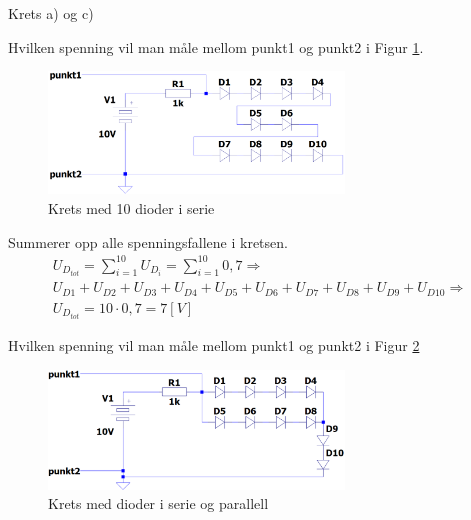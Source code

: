 \vspace{0.5cm} %

\begin{solution}[name=Løsningsforslag oppgave]
	Krets a) og c)
\end{solution}
\vspace{0.5cm} %

\begin{question}[name=Oppgave, topic=dioder]
Hvilken spenning vil man måle mellom punkt1 og punkt2 i Figur \ref{fig:10Dserie}.

	\begin{figure}[H]
		\centering
		\includegraphics[width=0.7\textwidth]{diode/figurer/10SerieD.png}
		\caption{Krets med 10 dioder i serie}
		\label{fig:10Dserie}
	\end{figure}

\end{question}

\vspace{0.5cm} %

\begin{solution}[name=Løsningsforslag oppgave]
	Summerer opp alle spenningsfallene i kretsen.
	\begin{multline*}
	U_{D_{tot}}=\sum_{i=1}^{10} U_{D_i}=\sum_{i=1}^{10} 0,7 \Rightarrow \\	U_{D1}+U_{D2}+U_{D3}+U_{D4}+U_{D5}+U_{D6}+U_{D7}+U_{D8}+U_{D9}+U_{D10} \Rightarrow \\ U_{D_{tot}}=10\cdot0,7=7 [V]
	\end{multline*}
\end{solution}

\vspace{0.5cm} %


\begin{question}[name=Oppgave, topic=dioder]
Hvilken spenning vil man måle mellom punkt1 og punkt2 i Figur \ref{fig:DserieParaMix}

	\begin{figure}[H]
	\centering
	\includegraphics[width=0.7\textwidth]{diode/figurer/6serieOgParaD.png}
	\caption{Krets med dioder i serie og parallell}
	\label{fig:DserieParaMix}
	\end{figure}


\end{question}


